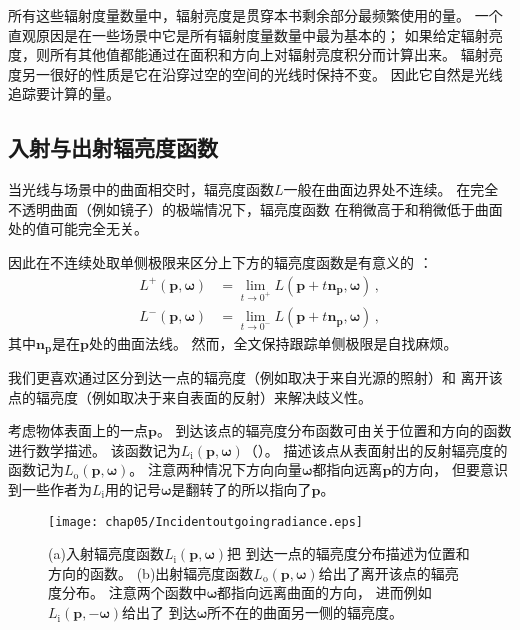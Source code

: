 所有这些辐射度量数量中，辐射亮度是贯穿本书剩余部分最频繁使用的量。
一个直观原因是在一些场景中它是所有辐射度量数量中最为基本的；
如果给定辐射亮度，则所有其他值都能通过在面积和方向上对辐射亮度积分而计算出来。
辐射亮度另一很好的性质是它在沿穿过空的空间的光线时保持不变。
因此它自然是光线追踪要计算的量。

\subsection{入射与出射辐亮度函数}\label{sub:入射与出射辐亮度函数}
当光线与场景中的曲面相交时，辐亮度函数$L$一般在曲面边界处不连续。
在完全不透明曲面（例如镜子）的极端情况下，辐亮度函数
在稍微高于和稍微低于曲面处的值可能完全无关。

因此在不连续处取单侧极限来区分上下方的辐亮度函数是有意义的
：
\begin{align}\label{eq:5.3}
    L^+({\bm p},{\bm\omega}) & =\lim\limits_{t\rightarrow 0^+}{L({\bm p}+t{\bm n}_{\bm p},{\bm\omega})}\, ,\nonumber \\
    L^-({\bm p},{\bm\omega}) & =\lim\limits_{t\rightarrow 0^-}{L({\bm p}+t{\bm n}_{\bm p},{\bm\omega})}\, ,
\end{align}
其中${\bm n}_{\bm p}$是在$\bm p$处的曲面法线。
然而，全文保持跟踪单侧极限是自找麻烦。

我们更喜欢通过区分到达一点的辐亮度（例如取决于来自光源的照射）和
离开该点的辐亮度（例如取决于来自表面的反射）来解决歧义性。

考虑物体表面上的一点$\bm p$。
到达该点的辐亮度分布函数可由关于位置和方向的函数进行数学描述。
该函数记为$L_{\mathrm{i}}({\bm p},{\bm\omega})$（）。
描述该点从表面射出的反射辐亮度的函数记为$L_{\mathrm{o}}({\bm p},{\bm\omega})$。
注意两种情况下方向向量$\bm\omega$都指向远离$\bm p$的方向，
但要意识到一些作者为$L_{\mathrm{i}}$用的记号$\bm\omega$是翻转了的所以指向了$\bm p$。
\begin{figure}[htbp]
    \centering\texttt{[image: chap05/Incidentoutgoingradiance.eps]}
    \caption{(a)入射辐亮度函数$L_{\mathrm{i}}({\bm p},{\bm\omega})$把
    到达一点的辐亮度分布描述为位置和方向的函数。
    (b)出射辐亮度函数$L_{\mathrm{o}}({\bm p},{\bm\omega})$给出了离开该点的辐亮度分布。
    注意两个函数中$\bm\omega$都指向远离曲面的方向，
    进而例如$L_{\mathrm{i}}({\bm p},-{\bm\omega})$给出了
    到达$\bm\omega$所不在的曲面另一侧的辐亮度。}
    \label{fig:5.11}
\end{figure}

